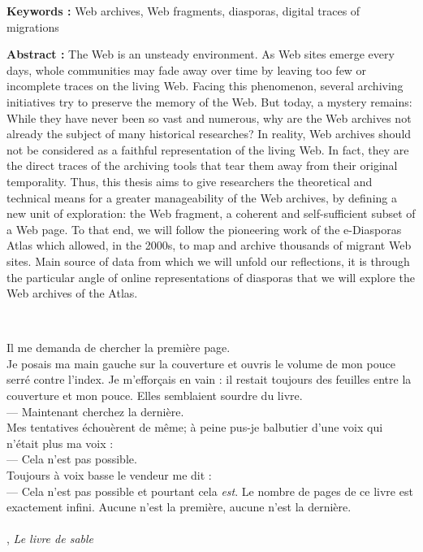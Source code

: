 \documentclass[symmetric,justified,marginals=raggedouter]{tufte-book}
\begin{document}
\begin{fullwidth}
\noindent\textbf{Keywords :} Web archives, Web fragments, diasporas, digital traces of migrations 

\noindent\textbf{Abstract :} The Web is an unsteady environment. As Web sites emerge every days, whole communities may fade away over time by leaving too few or incomplete traces on the living Web. Facing this phenomenon, several archiving initiatives try to preserve the memory of the Web. But today, a mystery remains: While they have never been so vast and numerous, why are the Web archives not already the subject of many historical researches? In reality, Web archives should not be considered as a faithful representation of the living Web. In fact, they are the direct traces of the archiving tools that tear them away from their original temporality. Thus, this thesis aims to give researchers the theoretical and technical means for a greater manageability of the Web archives, by defining a new unit of exploration: the Web fragment, a coherent and self-sufficient subset of a Web page. To that end, we will follow the pioneering work of the e-Diasporas Atlas which allowed, in the 2000s, to map and archive thousands of migrant Web sites. Main source of data from which we will unfold our reflections, it is through the particular angle of online representations of diasporas that we will explore the Web archives of the Atlas.


\end{fullwidth}
  
\vfill  
  
\thispagestyle{empty}%
\clearpage%


\newpage

~\vfill
\noindent
\par\noindent \og Il me demanda de chercher la première page.\\
\noindent Je posais ma main gauche sur la couverture et ouvris le volume de mon pouce serré contre l'index. Je m'efforçais en vain : il restait toujours des feuilles entre la couverture et mon pouce. Elles semblaient sourdre du livre.\\
--- Maintenant cherchez la dernière.\\
\noindent Mes tentatives échouèrent de même; à peine pus-je balbutier d'une voix qui n'était plus ma voix :\\
--- Cela n'est pas possible.\\
\noindent Toujours à voix basse le vendeur me dit : \\
--- Cela n'est pas possible et pourtant cela \textit{est}. Le nombre de pages de ce livre est exactement infini. Aucune n'est la première, aucune n'est la dernière. \fg
\\~\\
\noindent {}, \textit{Le livre de sable} 
\vfill
\indent
\end{document}
